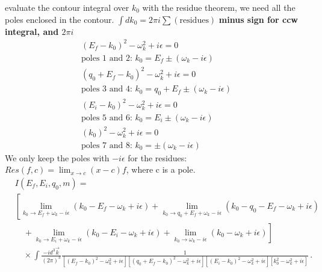  evaluate the contour integral over $k_0$ with the residue theorem, we need all the poles enclosed in the contour. $\int d k_0 = 2 \pi i \sum (\text{residues})$
{\bfseries minus sign for ccw integral, and $2\pi i$}
\begin{align}
(E_f - k_0)^2 - \omega_k^2 + i\epsilon = 0\\
\text{poles 1 and 2: } k_0 = E_f \pm (\omega_k -i \epsilon)\\
(q_0 + E_f - k_0)^2 - \omega_k^2 + i\epsilon = 0\\
\text{poles 3 and 4: } k_0 = q_0 + E_f \pm (\omega_k -i \epsilon)\\
(E_i - k_0)^2 - \omega_k^2 + i\epsilon = 0\\
\text{poles 5 and 6: } k_0 = E_i \pm (\omega_k -i \epsilon)\\
(k_0)^2 - \omega_k^2 + i\epsilon = 0\\
\text{poles 7 and 8: }k_0 =\pm (\omega_k -i \epsilon)
\end{align}
We only keep the poles with $-i \epsilon$ for the residues: $Res(f, c) = \lim_{x\to c} (x-c) f$, where c is a pole.
\begin{align*}
&I(E_f, E_i, q_0, m) = \\
&\left[
\lim_{k_0 \to E_f + \omega_k - i \epsilon} (k_0 - E_f - \omega_k + i \epsilon)
+ \lim_{k_0 \to q_0 + E_f + \omega_k - i \epsilon} (k_0 - q_0 - E_f - \omega_k + i \epsilon) \right. \\
&\quad + \lim_{k_0 \to E_i + \omega_k - i \epsilon} (k_0 - E_i - \omega_k + i \epsilon)
+ \left. \lim_{k_0 \to \omega_k - i \epsilon} (k_0 - \omega_k + i \epsilon) \right] \\
&\quad \times \int \frac{-i d^3 \vec{k}}{(2\pi)^3}
\frac{1}{
\left[(E_f - k_0)^2 - \omega_k^2 + i\epsilon\right]
\left[(q_0 + E_f - k_0)^2 - \omega_k^2 + i\epsilon\right]
\left[(E_i - k_0)^2 - \omega_k^2 + i\epsilon\right]
\left[k_0^2 - \omega_k^2 + i\epsilon\right]
}\,.
\end{align*}
